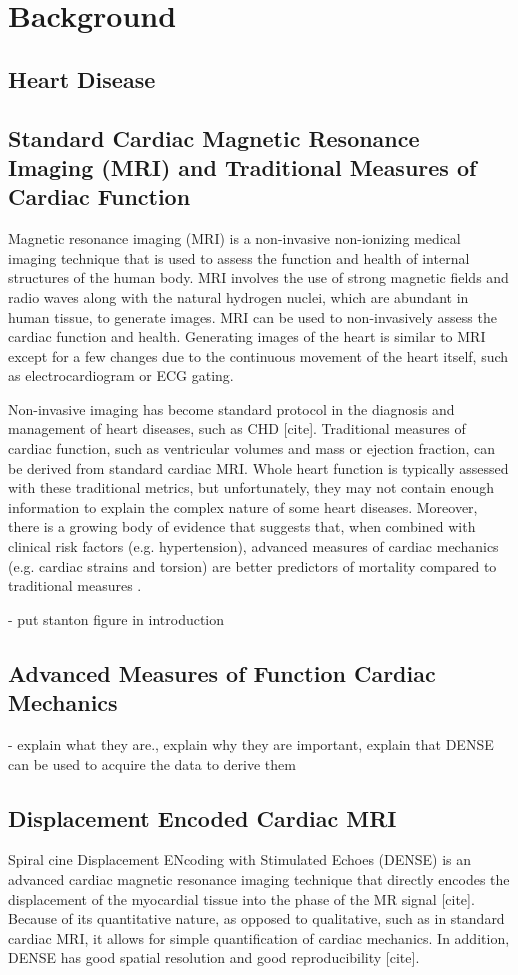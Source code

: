 \chapter{Background}

\section{Heart Disease}
\lipsum[1]

\section{Standard Cardiac Magnetic Resonance Imaging (MRI) and Traditional Measures of Cardiac Function}
Magnetic resonance imaging (MRI) is a non-invasive non-ionizing medical imaging technique that is used to assess the function and health of internal structures of the human body. MRI involves the use of strong magnetic fields and radio waves along with the natural hydrogen nuclei, which are abundant in human tissue, to generate images. MRI can be used to non-invasively assess the cardiac function and health. Generating images of the heart is similar to MRI except for a few changes due to the continuous movement of the heart itself, such as electrocardiogram or ECG gating.

Non-invasive imaging has become standard protocol in the diagnosis and management of heart diseases, such as CHD [cite]. Traditional measures of cardiac function, such as ventricular volumes and mass or ejection fraction, can be derived from standard cardiac MRI. Whole heart function is typically assessed with these traditional metrics, but unfortunately, they may not contain enough information to explain the complex nature of some heart diseases. Moreover, there is a growing body of evidence that suggests that, when combined with clinical risk factors (e.g. hypertension), advanced measures of cardiac mechanics (e.g. cardiac strains and torsion) are better predictors of mortality compared to traditional measures \cite{Stanton2009}.

- put stanton figure in introduction

\section{Advanced Measures of Function Cardiac Mechanics}
 - explain what they are., explain why they are important, explain that DENSE can be used to acquire the data to derive them

\section{Displacement Encoded Cardiac MRI}
Spiral cine Displacement ENcoding with Stimulated Echoes (DENSE) is an advanced cardiac magnetic resonance imaging technique that directly encodes the displacement of the myocardial tissue into the phase of the MR signal [cite]. Because of its quantitative nature, as opposed to qualitative, such as in standard cardiac MRI, it allows for simple quantification of cardiac mechanics. In addition, DENSE has good spatial resolution and good reproducibility [cite].

